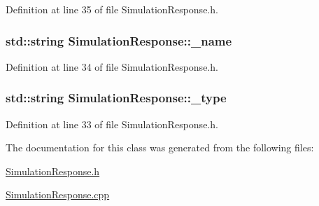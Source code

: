 Definition at line 35 of file Simulation\-Response.\-h.

\hypertarget{class_simulation_response_ad68ae541afb9cbf6cce4529eb4fb106f}{
\subsubsection[{\-\_\-name}]{\setlength{\rightskip}{0pt plus 5cm}std\-::string Simulation\-Response\-::\-\_\-name\hspace{0.3cm}{\ttfamily [protected]}}}\label{class_simulation_response_ad68ae541afb9cbf6cce4529eb4fb106f}


Definition at line 34 of file Simulation\-Response.\-h.

\hypertarget{class_simulation_response_af62ba9398deece20fd91dc29e2a79880}{
\subsubsection[{\-\_\-type}]{\setlength{\rightskip}{0pt plus 5cm}std\-::string Simulation\-Response\-::\-\_\-type\hspace{0.3cm}{\ttfamily [protected]}}}\label{class_simulation_response_af62ba9398deece20fd91dc29e2a79880}


Definition at line 33 of file Simulation\-Response.\-h.



The documentation for this class was generated from the following files\-:\begin{DoxyCompactItemize}
\item 
\hyperlink{_simulation_response_8h}{Simulation\-Response.\-h}\item 
\hyperlink{_simulation_response_8cpp}{Simulation\-Response.\-cpp}\end{DoxyCompactItemize}
